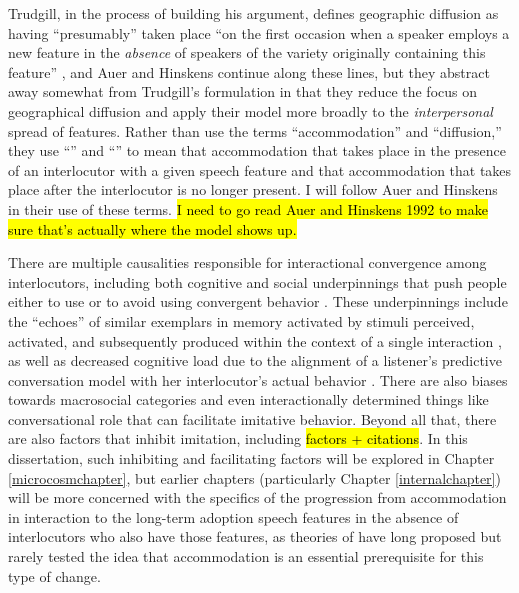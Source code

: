     Trudgill, in the process of building his argument,  defines geographic diffusion as having ``presumably'' taken place ``on the first occasion when a speaker employs a new feature in the \emph{absence} of speakers of the variety originally containing this feature'' \citeyearpar[emphasis in original]{trudgill1986dialects}, and Auer and Hinskens continue along these lines, but they abstract away somewhat from Trudgill's formulation in that they reduce the focus on geographical diffusion and apply their model more broadly to the \emph{interpersonal} spread of features. Rather than use the terms ``accommodation'' and ``diffusion,'' they use ``\sta{}'' and ``\lta{}'' to mean that accommodation that takes place in the presence of an interlocutor with a given speech feature and that accommodation that takes place after the interlocutor is no longer present. I will follow Auer and Hinskens in their use of these terms. \hl{I need to go read Auer and Hinskens 1992 to make sure that’s actually where the model shows up.}
    
    There are multiple causalities responsible for interactional convergence among interlocutors, including both cognitive and social underpinnings that push people either to use or to avoid using convergent behavior \citep{coles2017perspectives}. These underpinnings include the ``echoes'' of similar exemplars in memory activated by stimuli perceived, activated, and subsequently produced within the context of a single interaction \citep{goldinger1998echoes}, as well as decreased cognitive load due to the alignment of a listener's predictive conversation model with her interlocutor's actual behavior \citep{pickering2004toward,pickering2013integrated}. There are also biases towards macrosocial categories \citep{babel2010dialect} and even interactionally determined things like conversational role \citep{pardo2006phonetic} that can facilitate imitative behavior. Beyond all that, there are also factors that inhibit imitation, including \hl{factors + citations}. In this dissertation, such inhibiting and facilitating factors will be explored in Chapter \ref{microcosmchapter}, but earlier chapters (particularly Chapter \ref{internalchapter}) will be more concerned with the specifics of the progression from accommodation in interaction to the long-term adoption speech features in the absence of interlocutors who also have those features, as theories of \cidc{} have long proposed but rarely tested the idea that accommodation is an essential prerequisite for this type of change.
    
